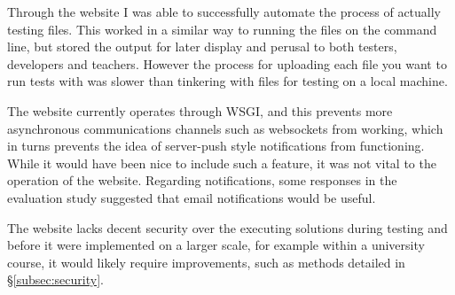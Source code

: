 \documentclass[a4paper,11pt]{report}
\begin{document}
Through the website I was able to successfully automate the process of actually testing files. This worked in a similar way to running the files on the command line, but stored the output for later display and perusal to both testers, developers and teachers. However the process for uploading each file you want to run tests with was slower than tinkering with files for testing on a local machine.\par
The website currently operates through WSGI, and this prevents more asynchronous communications channels such as websockets from working, which in turns prevents the idea of server-push style notifications from functioning. While it would have been nice to include such a feature, it was not vital to the operation of the website. Regarding notifications, some responses in the evaluation study suggested that email notifications would be useful.\par
The website lacks decent security over the executing solutions during testing and before it were implemented on a larger scale, for example within a university course, it would likely require improvements, such as methods detailed in \S\ref{subsec:security}.\par
\end{document}
